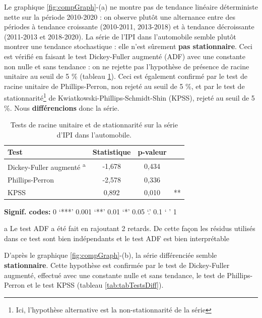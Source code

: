 \documentclass[french]{article}
\let\rmarkdownfootnote\footnote%
\def\footnote{\protect\rmarkdownfootnote}
\begin{document}
Le graphique \ref{fig:compGraph}-(a) ne montre pas de tendance linéaire déterministe nette sur la période 2010-2020 : on observe plutôt une alternance entre des périodes à tendance croissante (2010-2011, 2013-2018) et à tendance décroissante (2011-2013 et 2018-2020).
La série de l'IPI dans l'automobile semble plutôt montrer une tendance stochastique : elle n'est sûrement \textbf{pas stationnaire}. Ceci est vérifié en faisant le test Dickey-Fuller augmenté (ADF) avec une constante non nulle et sans tendance : on ne rejette pas l'hypothèse de présence de racine unitaire au seuil de 5 \% (tableau \ref{tab:tabTestsInit}).
Ceci est également confirmé par le test de racine unitaire de Phillips-Perron, non rejeté au seuil de 5 \%, et par le test de stationnarité\footnote{Ici, l'hypothèse alternative est la non-stationnarité de la série} de Kwiatkowski-Phillips-Schmidt-Shin (KPSS), rejeté au seuil de 5 \%. Nous \textbf{différencions} donc la série.

\begin{table}[!h]

\caption{\label{tab:tabTestsInit}Tests de racine unitaire et de stationnarité sur la série d'IPI dans l'automobile.}
\centering
\begin{threeparttable}
\begin{tabular}[t]{lccc}
\toprule
Test & Statistique & p-valeur & \\
\midrule
Dickey-Fuller augmenté \textsuperscript{a} & -1,678 & 0,434 & \\
Phillips-Perron & -2,578 & 0,336 & \\
KPSS & 0,892 & 0,010 & **\\
\bottomrule
\end{tabular}
\begin{tablenotes}
\item \hspace{-0.4cm}\textbf{Signif. codes: }0 `***' 0.001 `**' 0.01 `*' 0.05 `.' 0.1 ` ' 1
\item[a] Le test ADF a été fait en rajoutant 2 retards. De cette façon les résidus utilisés dans ce test sont bien indépendants et le test ADF est bien interprétable
\end{tablenotes}
\end{threeparttable}
\end{table}

D'après le graphique \ref{fig:compGraph}-(b), la série différenciée semble \textbf{stationnaire}.
Cette hypothèse est confirmée par le test de Dickey-Fuller augmenté, effectué avec une constante nulle et sans tendance, le test de Phillips-Perron et le test KPSS (tableau \ref{tab:tabTestsDiff}).
\end{document}
